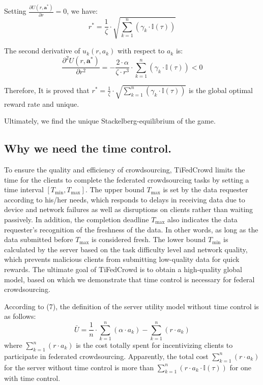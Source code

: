 \documentclass[final,1p,times]{elsarticle}
\begin{document}
Setting $\frac{\partial U(r,\bm{a}^\ast)}{\partial r} = 0$, we have:
\begin{equation}
	r^\ast =\frac{1}{\zeta}\cdot\sqrt{\sum_{k=1}^n(\gamma_k\cdot\mathbb{I}(\tau))}
\end{equation}	

The second derivative of $u_k(r,a_k)$ with respect to $a_k$ is:
\begin{equation}
	\frac{\partial^2 U(r,\bm{a}^\ast)}{\partial r^2} = - \frac{2\cdot\alpha}{\zeta\cdot r^3}\cdot\sum_{k=1}^n(\gamma_k\cdot\mathbb{I}(\tau)) < 0
\end{equation}	

Therefore, It is proved that $r^\ast = \frac{1}{\zeta}\cdot\sqrt{\sum_{k=1}^n(\gamma_k\cdot\mathbb{I}(\tau))}$ is the global optimal reward rate and unique. 

Ultimately, we find the unique Stackelberg-equilibrium of the game.
\subsection{Why we need the time control.}
To ensure the quality and efficiency of crowdsourcing, TiFedCrowd limits the time for the clients to complete the federated crowdsourcing tasks by setting a time interval $[T_{\min},T_{\max}]$. The upper bound $T_{\max}$ is set by the data requester according to his/her needs, which responds to delays in receiving data due to device and network failures as well as disruptions on clients rather than waiting passively. In addition, the completion deadline $T_{\max}$ also indicates the data requester's recognition of the freshness of the data. In other words, as long as the data submitted before $T_{\max}$ is considered fresh. The lower bound $T_{\min}$ is calculated by the server based on the task difficulty level and network quality, which prevents malicious clients from submitting low-quality data for quick rewards. The ultimate goal of TiFedCrowd is to obtain a high-quality global model, based on which we demonstrate that time control is necessary for federal crowdsourcing.

According to (7), the definition of the server utility model without time control is as follows: 
\begin{equation}
	\bar{U} = \frac{1}{n}\cdot \sum_{k=1}^n(\alpha\cdot a_k)  - \sum_{k=1}^n(r\cdot a_k)
\end{equation}
where $\sum_{k=1}^n(r\cdot a_k)$ is the cost totally spent for incentivizing clients to participate in federated crowdsourcing. Apparently, the total cost $\sum_{k=1}^n(r\cdot a_k)$ for the server without time control is more than $\sum_{k=1}^n(r\cdot a_k\cdot \mathbb{I}(\tau))$ for one with time control.
\end{document}
